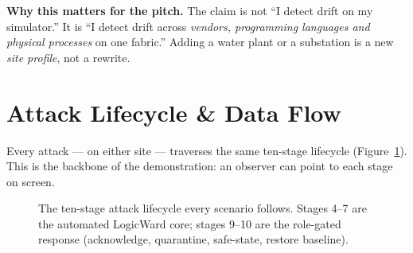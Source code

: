 \documentclass[11pt,a4paper]{article}
\begin{document}
\begin{keybox}
\textbf{Why this matters for the pitch.} The claim is not ``I detect drift on my simulator.'' It
is ``I detect drift across \emph{vendors, programming languages and physical processes} on one
fabric.'' Adding a water plant or a substation is a new \emph{site profile}, not a rewrite.
\end{keybox}

\section{Attack Lifecycle \& Data Flow}
Every attack --- on either site --- traverses the same ten-stage lifecycle (Figure~\ref{fig:flow}).
This is the backbone of the demonstration: an observer can point to each stage on screen.

\begin{figure}[h]
\centering
{}
\caption{The ten-stage attack lifecycle every scenario follows. Stages 4--7 are the automated
LogicWard core; stages 9--10 are the role-gated response (acknowledge, quarantine, safe-state,
restore baseline).}
\label{fig:flow}
\end{figure}
\end{document}
